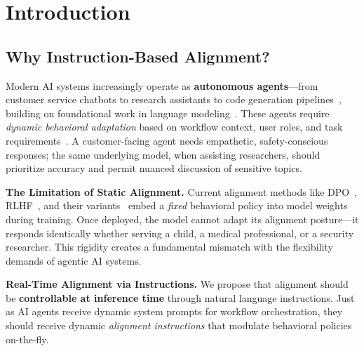 
\vspace{-2mm}
\section{Introduction}
\label{sec:introduction}

\subsection{Why Instruction-Based Alignment?}
\label{sec:why_instruction_alignment}

Modern AI systems increasingly operate as \textbf{autonomous agents}---from customer service chatbots to research assistants to code generation pipelines~\cite{brown2020language,openai2023gpt4,touvron2023llama}, building on foundational work in language modeling~\cite{vaswani2017attention,devlin2019bert,radford2019language}. These agents require \textit{dynamic behavioral adaptation} based on workflow context, user roles, and task requirements~\cite{shinn2023reflexion}. A customer-facing agent needs empathetic, safety-conscious responses; the same underlying model, when assisting researchers, should prioritize accuracy and permit nuanced discussion of sensitive topics.

\textbf{The Limitation of Static Alignment.} Current alignment methods like DPO~\cite{rafailov2023direct}, RLHF~\cite{ouyang2022training,stiennon2020learning}, and their variants~\cite{azar2023general,ethayarajh2024kto} embed a \textit{fixed} behavioral policy into model weights during training. Once deployed, the model cannot adapt its alignment posture---it responds identically whether serving a child, a medical professional, or a security researcher. This rigidity creates a fundamental mismatch with the flexibility demands of agentic AI systems.

\textbf{Real-Time Alignment via Instructions.} We propose that alignment should be \textbf{controllable at inference time} through natural language instructions. Just as AI agents receive dynamic system prompts for workflow orchestration, they should receive dynamic \textit{alignment instructions} that modulate behavioral policies on-the-fly.


